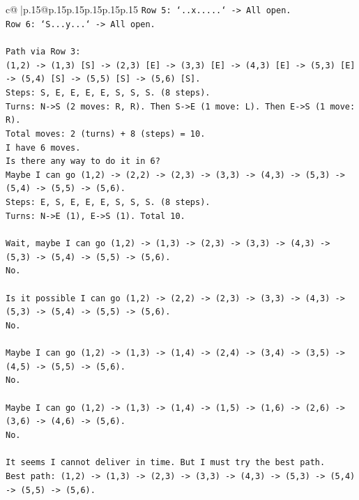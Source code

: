 \documentclass{article}
\begin{document}
{\begin{supertabular}{c@{$\;$}|p{.15\linewidth}@{}p{.15\linewidth}p{.15\linewidth}p{.15\linewidth}p{.15\linewidth}p{.15\linewidth}}
{{{\texttt{Row 5: `..x.....` {-}> All open.} \\
\texttt{Row 6: `S...y...` {-}> All open.} \\
\\ 
\texttt{Path via Row 3:} \\
\texttt{(1,2) {-}> (1,3) {[}S{]} {-}> (2,3) {[}E{]} {-}> (3,3) {[}E{]} {-}> (4,3) {[}E{]} {-}> (5,3) {[}E{]} {-}> (5,4) {[}S{]} {-}> (5,5) {[}S{]} {-}> (5,6) {[}S{]}.} \\
\texttt{Steps: S, E, E, E, E, S, S, S. (8 steps).} \\
\texttt{Turns: N{-}>S (2 moves: R, R). Then S{-}>E (1 move: L). Then E{-}>S (1 move: R).} \\
\texttt{Total moves: 2 (turns) + 8 (steps) = 10.} \\
\texttt{I have 6 moves.} \\
\texttt{Is there any way to do it in 6?} \\
\texttt{Maybe I can go (1,2) {-}> (2,2) {-}> (2,3) {-}> (3,3) {-}> (4,3) {-}> (5,3) {-}> (5,4) {-}> (5,5) {-}> (5,6).} \\
\texttt{Steps: E, S, E, E, E, S, S, S. (8 steps).} \\
\texttt{Turns: N{-}>E (1), E{-}>S (1). Total 10.} \\
\\ 
\texttt{Wait, maybe I can go (1,2) {-}> (1,3) {-}> (2,3) {-}> (3,3) {-}> (4,3) {-}> (5,3) {-}> (5,4) {-}> (5,5) {-}> (5,6).} \\
\texttt{No.} \\
\\ 
\texttt{Is it possible I can go (1,2) {-}> (2,2) {-}> (2,3) {-}> (3,3) {-}> (4,3) {-}> (5,3) {-}> (5,4) {-}> (5,5) {-}> (5,6).} \\
\texttt{No.} \\
\\ 
\texttt{Maybe I can go (1,2) {-}> (1,3) {-}> (1,4) {-}> (2,4) {-}> (3,4) {-}> (3,5) {-}> (4,5) {-}> (5,5) {-}> (5,6).} \\
\texttt{No.} \\
\\ 
\texttt{Maybe I can go (1,2) {-}> (1,3) {-}> (1,4) {-}> (1,5) {-}> (1,6) {-}> (2,6) {-}> (3,6) {-}> (4,6) {-}> (5,6).} \\
\texttt{No.} \\
\\ 
\texttt{It seems I cannot deliver in time. But I must try the best path.} \\
\texttt{Best path: (1,2) {-}> (1,3) {-}> (2,3) {-}> (3,3) {-}> (4,3) {-}> (5,3) {-}> (5,4) {-}> (5,5) {-}> (5,6).} \\
}}}
\end{supertabular}}
\end{document}
